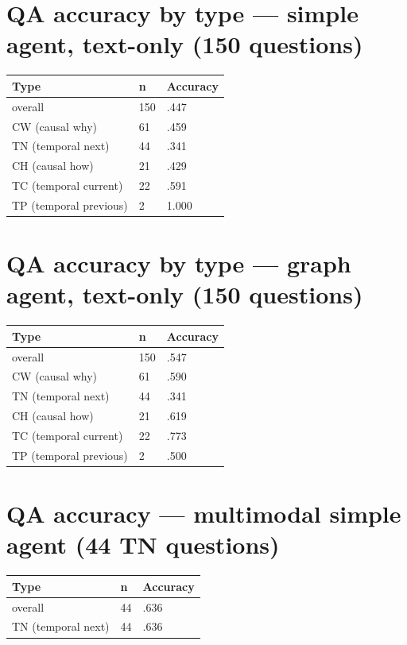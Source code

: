 \section{QA accuracy by type --- simple agent, text-only (150
questions)}

\begin{longtable}[]{@{}lll@{}}
\toprule\noalign{}
Type & n & Accuracy \\
\midrule\noalign{}
\endhead
\bottomrule\noalign{}
\endlastfoot
overall & 150 & .447 \\
CW (causal why) & 61 & .459 \\
TN (temporal next) & 44 & .341 \\
CH (causal how) & 21 & .429 \\
TC (temporal current) & 22 & .591 \\
TP (temporal previous) & 2 & 1.000 \\
\end{longtable}

\section{QA accuracy by type --- graph agent, text-only (150
questions)}

\begin{longtable}[]{@{}lll@{}}
\toprule\noalign{}
Type & n & Accuracy \\
\midrule\noalign{}
\endhead
\bottomrule\noalign{}
\endlastfoot
overall & 150 & .547 \\
CW (causal why) & 61 & .590 \\
TN (temporal next) & 44 & .341 \\
CH (causal how) & 21 & .619 \\
TC (temporal current) & 22 & .773 \\
TP (temporal previous) & 2 & .500 \\
\end{longtable}

\section{QA accuracy --- multimodal simple agent (44 TN
questions)}

\begin{longtable}[]{@{}lll@{}}
\toprule\noalign{}
Type & n & Accuracy \\
\midrule\noalign{}
\endhead
\bottomrule\noalign{}
\endlastfoot
overall & 44 & .636 \\
TN (temporal next) & 44 & .636 \\
\end{longtable}
